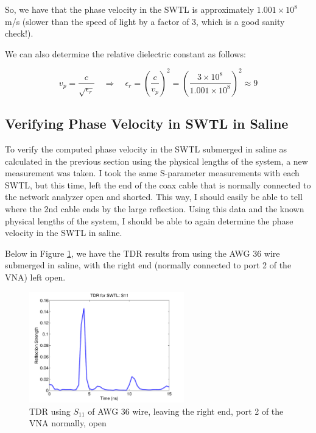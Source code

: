 \documentclass[12pt,onecolumn,titlepage]{article}
\begin{document}
So, we have that the phase velocity in the SWTL is approximately $1.001 \times 10^8$ m/s (slower than the speed of light by a factor of 3, which is a good sanity check!). 

We can also determine the relative dielectric constant as follows:

\[ v_p = \frac{c}{\sqrt{\epsilon_r}} \quad \Rightarrow \quad \epsilon_r = \left( \frac{c}{v_p} \right)^2 = \left( \frac{3 \times 10^8}{1.001 \times 10^8} \right)^2 \approx 9 \]



\subsection{Verifying Phase Velocity in SWTL in Saline}
\indent \indent To verify the computed phase velocity in the SWTL submerged in saline as calculated in the previous section using the physical lengths of the system, a new measurement was taken. I took the same S-parameter measurements with each SWTL, but this time, left the end of the coax cable that is normally connected to the network analyzer open and shorted. This way, I should easily be able to tell where the 2nd cable ends by the large reflection. Using this data and the known physical lengths of the system, I should be able to again determine the phase velocity in the SWTL in saline. 

Below in Figure \ref{fig:SWTL_TDR_s11_AWG36_port2open}, we have the TDR results from using the AWG 36 wire submerged in saline, with the right end (normally connected to port 2 of the VNA) left open. 



\begin{figure}[htbp]
	\centering
	\includegraphics[width=0.6\textwidth]{Pictures/22July2013/SWTL_TDR_s11_AWG36_port2open}
	\caption{ TDR using $S_{11}$ of AWG 36 wire, leaving the right end, port 2 of the VNA normally, open } 
	\label{fig:SWTL_TDR_s11_AWG36_port2open}
\end{figure}
\end{document}
